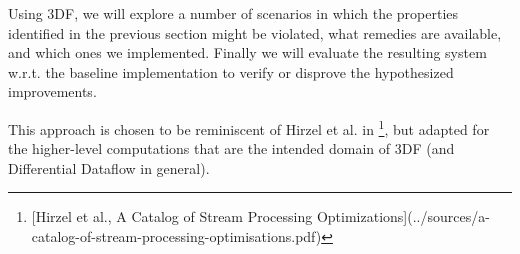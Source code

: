 \documentclass[../index.tex]{subfiles}
\begin{document}
Using 3DF, we will explore a number of scenarios in which the
properties identified in the previous section might be violated, what
remedies are available, and which ones we implemented. Finally we will
evaluate the resulting system w.r.t. the baseline implementation to
verify or disprove the hypothesized improvements.

This approach is chosen to be reminiscent of Hirzel et al. in \footnote{[Hirzel et al., A Catalog of Stream Processing Optimizations](../sources/a-catalog-of-stream-processing-optimisations.pdf)}, but
adapted for the higher-level computations that are the intended domain
of 3DF (and Differential Dataflow in general).
\end{document}
